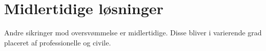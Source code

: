 \section{Midlertidige løsninger}\label{sc:midlertidige}

Andre sikringer mod oversvømmelse er midlertidige. Disse bliver i varierende grad placeret af professionelle og civile.

